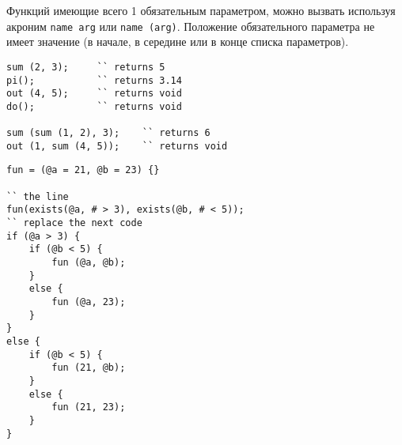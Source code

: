 Функций имеющие всего 1 обязательным параметром, можно вызвать используя акроним \lstinline|name arg| или \lstinline|name (arg)|. Положение обязательного параметра не имеет значение (в начале, в середине или в конце списка параметров).

\begin{lstlisting}[caption=Вызов функций, label=callfunc]
sum (2, 3); 	`` returns 5
pi();			`` returns 3.14
out (4, 5); 	`` returns void
do();			`` returns void

sum (sum (1, 2), 3);	`` returns 6
out (1, sum (4, 5));	`` returns void
\end{lstlisting}

\begin{lstlisting}[caption=Значения по умольчанию, label=defaultparametrs]
fun = (@a = 21, @b = 23) {}

`` the line 
fun(exists(@a, # > 3), exists(@b, # < 5));
`` replace the next code
if (@a > 3) {
	if (@b < 5) {
		fun (@a, @b);
	}
	else {
		fun (@a, 23);
	}
}
else {
	if (@b < 5) {
		fun (21, @b);
	}
	else {
		fun (21, 23);
	}
}
\end{lstlisting}

